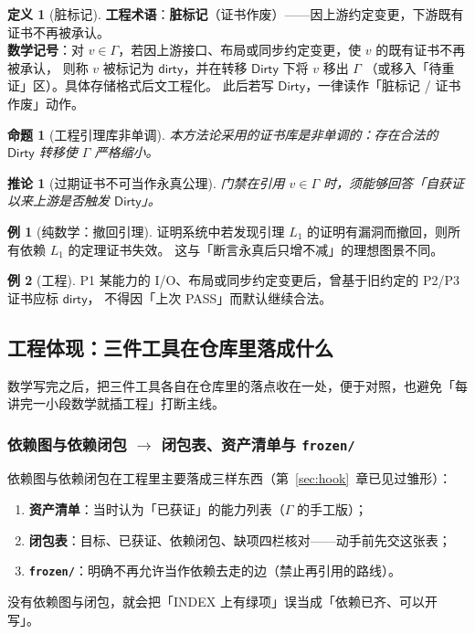 \documentclass[UTF8,a4paper,11pt]{ctexart}
\theoremstyle{definition}
\newtheorem{definition}{定义}[section]
\newtheorem{example}{例}[section]
\theoremstyle{plain}
\newtheorem{proposition}{命题}[section]
\newtheorem{corollary}{推论}[section]
\theoremstyle{remark}
\numberwithin{figure}{section}
\numberwithin{table}{section}
\begin{document}
\begin{definition}[脏标记]
\label{def:dirty}
\textbf{工程术语}：\textbf{脏标记}（证书作废）——因上游约定变更，下游既有证书不再被承认。\\
\textbf{数学记号}：对 $v\in\Gamma$，若因上游接口、布局或同步约定变更，使 $v$ 的既有证书不再被承认，
则称 $v$ 被标记为 $\mathsf{dirty}$，并在转移 $\mathsf{Dirty}$ 下将 $v$ 移出 $\Gamma$
（或移入「待重证」区）。具体存储格式后文工程化。
此后若写 $\mathsf{Dirty}$，一律读作「脏标记 / 证书作废」动作。
\end{definition}

\begin{proposition}[工程引理库非单调]
本方法论采用的证书库是非单调的：存在合法的 $\mathsf{Dirty}$ 转移使 $\Gamma$ 严格缩小。
\end{proposition}

\begin{corollary}[过期证书不可当作永真公理]
门禁在引用 $v\in\Gamma$ 时，须能够回答「自获证以来上游是否触发 $\mathsf{Dirty}$」。
\end{corollary}

\begin{example}[纯数学：撤回引理]
证明系统中若发现引理 $L_1$ 的证明有漏洞而撤回，则所有依赖 $L_1$ 的定理证书失效。
这与「断言永真后只增不减」的理想图景不同。
\end{example}

\begin{example}[工程]
P1 某能力的 I/O、布局或同步约定变更后，曾基于旧约定的 P2/P3 证书应标 $\mathsf{dirty}$，
不得因「上次 PASS」而默认继续合法。
\end{example}


\subsection{工程体现：三件工具在仓库里落成什么}
\label{sec:mathbg-eng}

数学写完之后，把三件工具各自在仓库里的落点收在一处，便于对照，也避免「每讲完一小段数学就插工程」打断主线。

\subsubsection{依赖图与依赖闭包 $\to$ 闭包表、资产清单与 \texttt{frozen/}}
\label{sec:tool-dep-eng}

依赖图与依赖闭包在工程里主要落成三样东西（第~\ref{sec:hook}~章已见过雏形）：
\begin{enumerate}
  \item \textbf{资产清单}：当时认为「已获证」的能力列表（$\Gamma$ 的手工版）；
  \item \textbf{闭包表}：目标、已获证、依赖闭包、缺项四栏核对——动手前先交这张表；
  \item \textbf{\texttt{frozen/}}：明确不再允许当作依赖去走的边（禁止再引用的路线）。
\end{enumerate}
没有依赖图与闭包，就会把「INDEX 上有绿项」误当成「依赖已齐、可以开写」。
\end{document}
